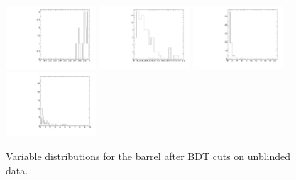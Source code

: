 \begin{figure}
  \includegraphics[width=0.3\textwidth]{Figures/AfterBDTCut_iso_BarrelUnblinded.pdf}
  \includegraphics[width=0.3\textwidth]{Figures/AfterBDTCut_docatrk_BarrelUnblinded.pdf}
  \includegraphics[width=0.3\textwidth]{Figures/AfterBDTCut_closetrk_BarrelUnblinded.pdf}
  \includegraphics[width=0.3\textwidth]{Figures/AfterBDTCut_chi2dof_BarrelUnblinded.pdf}
  \caption{Variable distributions for the barrel after BDT cuts on unblinded data.}
  \label{fig:AfterBDTCutVariablesBarrelUnblinded}
\end{figure}

